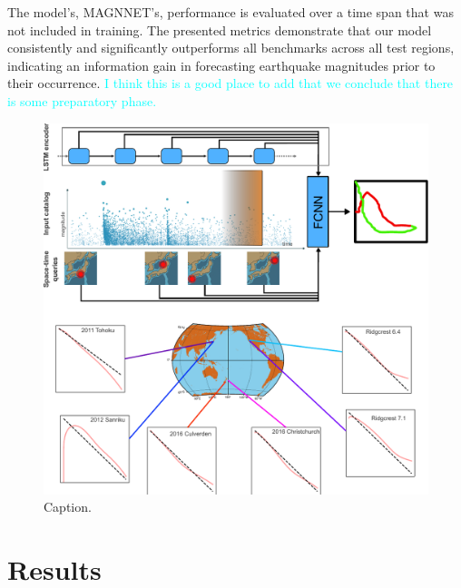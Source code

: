 \documentclass[pdflatex]{sn-jnl}
\newcommand{\neri}[1]{{\textcolor{cyan}{#1}}}
\begin{document}
The model's, MAGNNET's, performance is evaluated over a time span that was not included in training. The presented metrics demonstrate that our model consistently and significantly outperforms all benchmarks across all test regions, indicating an information gain in forecasting earthquake magnitudes prior to their occurrence. \neri{I think this is a good place to add that we conclude that there is some preparatory phase.}

\begin{figure}[h!]
	\centering
        \includegraphics[width=1\textwidth]{figures/intro_fig.pdf}
	\caption{
 Caption.
}
\label{fig:intro_fig}
\end{figure}



\section{Results} \label{sec:results}
\end{document}
